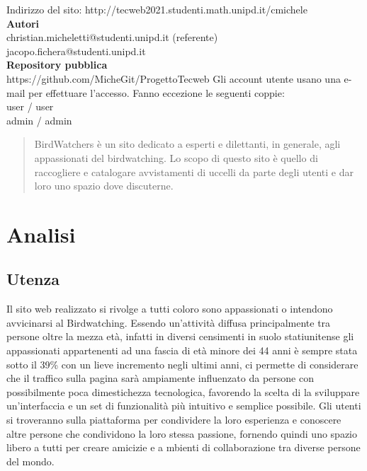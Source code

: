 \documentclass[12pt, a4paper]{article}
\begin{document}
    \begin{titlepage}
        \begin{center}
            Indirizzo del sito: http://tecweb2021.studenti.math.unipd.it/cmichele \\
            \textbf{Autori} \\
            christian.micheletti@studenti.unipd.it (referente) \\
            jacopo.fichera@studenti.unipd.it \\
            \textbf{Repository pubblica} \\
            https://github.com/MicheGit/ProgettoTecweb
            \vfill
            Gli account utente usano una e-mail per effettuare l'accesso. Fanno eccezione le seguenti coppie: \\
            user / user \\
            admin / admin
        \end{center}
    \end{titlepage}

    \newpage

    \tableofcontents

    \newpage

    \begin{abstract}
        BirdWatchers è un sito dedicato a esperti e dilettanti, in generale, agli appassionati del birdwatching. Lo scopo di questo sito è quello di raccogliere e catalogare avvistamenti di uccelli da parte degli utenti e dar loro uno spazio dove discuterne.
    \end{abstract}

    \newpage


    \section{Analisi}

    \subsection{Utenza}
    Il sito web realizzato si rivolge a tutti coloro sono appassionati o intendono avvicinarsi al Birdwatching.
    Essendo un'attività diffusa principalmente tra persone oltre la mezza età, infatti in diversi censimenti
    in suolo statiunitense gli appassionati appartenenti ad una fascia di età minore dei 44 anni è sempre stata sotto il 39\%
    con un lieve incremento negli ultimi anni, ci permette di  considerare che il traffico sulla pagina sarà ampiamente
    influenzato da persone con possibilmente poca dimestichezza tecnologica, favorendo la scelta di la sviluppare
    un'interfaccia e un set di funzionalità più intuitivo e semplice possibile.
    Gli utenti si troveranno sulla piattaforma per condividere la loro esperienza e conoscere altre persone che
    condividono la loro stessa passione, fornendo quindi uno spazio libero a tutti per creare amicizie e a
    mbienti di collaborazione tra diverse persone del mondo.
\end{document}
